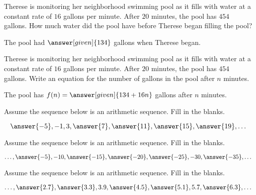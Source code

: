 \documentclass[nooutcomes]{ximera}
\begin{document}
\begin{problem}
Therese is monitoring her neighborhood swimming pool as it fills with water at a constant rate of $16$ gallons per minute.  After $20$ minutes, the pool has $454$ gallons.  How much water did the pool have before Therese began filling the pool?

\begin{prompt}
The pool had $\answer[given]{134}$ gallons when Therese began.
\end{prompt}
\end{problem}




\begin{problem}
Therese is monitoring her neighborhood swimming pool as it fills with water at a constant rate of $16$ gallons per minute.  After $20$ minutes, the pool has $454$ gallons.  Write an equation for the number of gallons in the pool after $n$ minutes.

\begin{prompt}
The pool has $f(n) = \answer[given]{134+16n}$ gallons after $n$ minutes.
\end{prompt}
\end{problem}




\begin{problem}
Assume the sequence below is an arithmetic sequence.  Fill in the blanks.

\[
\answer{-5}, -1, 3, \answer{7}, \answer{11}, \answer{15}, \answer{19}, \dots
\]

\end{problem}





\begin{problem}
Assume the sequence below is an arithmetic sequence.  Fill in the blanks.

\[
\dots, \answer{-5}, -10, \answer{-15}, \answer{-20}, \answer{-25}, -30, \answer{-35}, \dots
\]

\end{problem}




\begin{problem}
Assume the sequence below is an arithmetic sequence.  Fill in the blanks.

\[
\dots, \answer{2.7}, \answer{3.3}, 3.9, \answer{4.5}, \answer{5.1}, 5.7, \answer{6.3}, \dots
\]

\end{problem}
\end{document}
